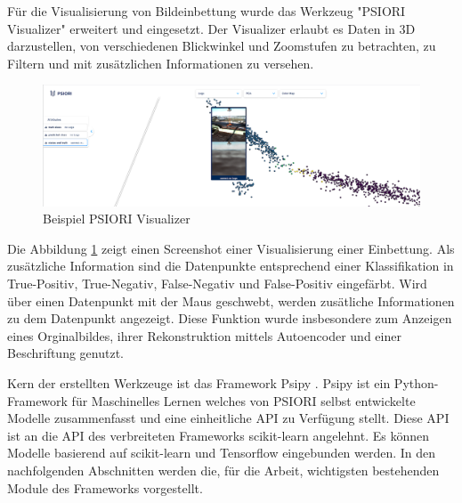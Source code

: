 	Für die Visualisierung von Bildeinbettung wurde das Werkzeug "PSIORI Visualizer" erweitert und eingesetzt. Der Visualizer erlaubt es Daten in 3D darzustellen, von verschiedenen Blickwinkel und Zoomstufen zu betrachten, zu Filtern und mit zusätzlichen Informationen zu versehen. 
	\begin{figure}[h]
		\centering
		\includegraphics[width=1\textwidth, center]{bilder/Grundlagen/Example_Visualizer.png}
		\caption[Beispiel PSIORI Visualizer]{Beispiel PSIORI Visualizer}
		\label{img:ExampleVisualizer}
	\end{figure}  
	Die Abbildung \ref{img:ExampleVisualizer} zeigt einen Screenshot einer Visualisierung einer  Einbettung. Als zusätzliche Information sind die Datenpunkte entsprechend einer Klassifikation in True-Positiv, True-Negativ, False-Negativ und False-Positiv eingefärbt. Wird über einen Datenpunkt mit der Maus geschwebt, werden zusätliche Informationen zu dem Datenpunkt angezeigt. Diese Funktion wurde insbesondere zum Anzeigen eines Orginalbildes, ihrer Rekonstruktion mittels Autoencoder und einer Beschriftung  genutzt. 
	
	Kern der erstellten Werkzeuge ist das Framework  Psipy \cite{PSIORIGmbH.2019}. Psipy ist ein Python-Framework für Maschinelles Lernen welches von PSIORI selbst entwickelte Modelle zusammenfasst und eine einheitliche API zu Verfügung stellt. Diese API ist an die API des verbreiteten Frameworks scikit-learn angelehnt. Es können Modelle basierend auf scikit-learn  und Tensorflow eingebunden werden. 	
	In den nachfolgenden Abschnitten werden die, für die Arbeit, wichtigsten bestehenden Module des Frameworks vorgestellt.
	

